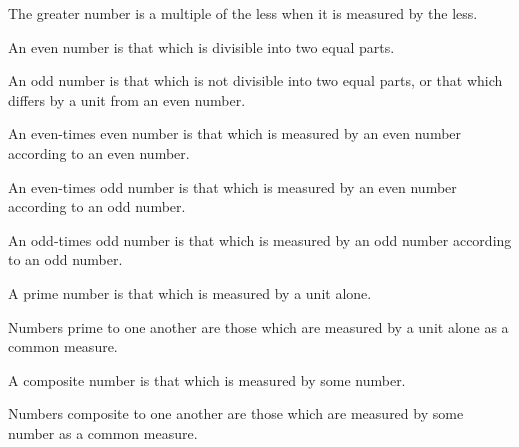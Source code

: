 \documentclass{rrxiv}
\begin{document}
\begin{scope}
\label{def:VII.5}
The greater number is a multiple of the less when it is measured by
the less.
\end{scope}

\begin{scope}
\label{def:VII.6}
An even number is that which is divisible into two equal parts.
\end{scope}

\begin{scope}
\label{def:VII.7}
An odd number is that which is not divisible into two equal parts, or
that which differs by a unit from an even number.
\end{scope}

\begin{scope}
\label{def:VII.8}
An even-times even number is that which is measured by an even number
according to an even number.
\end{scope}

\begin{scope}
\label{def:VII.9}
An even-times odd number is that which is measured by an even number
according to an odd number.
\end{scope}

\begin{scope}
\label{def:VII.10}
An odd-times odd number is that which is measured by an odd number
according to an odd number.
\end{scope}

\begin{scope}
\label{def:VII.11}
A prime number is that which is measured by a unit alone.
\end{scope}

\begin{scope}
\label{def:VII.12}
Numbers prime to one another are those which are measured by a unit
alone as a common measure.
\end{scope}

\begin{scope}
\label{def:VII.13}
A composite number is that which is measured by some number.
\end{scope}

\begin{scope}
\label{def:VII.14}
Numbers composite to one another are those which are measured by some
number as a common measure.
\end{scope}
\end{document}
